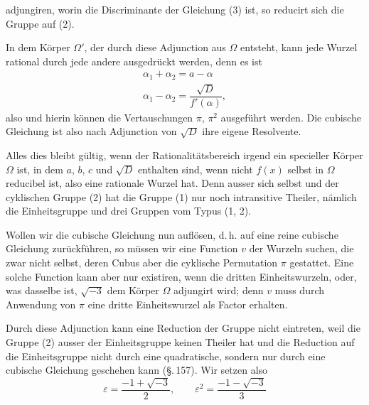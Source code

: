 
adjungiren, worin
die Discriminante der Gleichung (3) ist, so reducirt sich die Gruppe
auf (2).

In dem K\"orper $\Omega'$, der durch diese Adjunction aus $\Omega$
entsteht, kann jede Wurzel rational durch jede andere ausgedr\"uckt
werden, denn es ist
\[
\begin{gathered}
\alpha_1 + \alpha_2 = a - \alpha\\
\alpha_1 - \alpha_2 = \dfrac{\sqrt{D}}{f'(\alpha)},
\end{gathered}
\]
also
und hierin k\"onnen die Vertauschungen $\pi$, $\pi^2$ ausgef\"uhrt
werden. Die cubische Gleichung ist also nach Adjunction von $\sqrt{D}$
ihre eigene  Resolvente.

Alles dies bleibt g\"ultig, wenn der Rationalit\"atsbereich irgend
ein specieller K\"orper $\Omega$ ist, in dem $a$, $b$, $c$ und
$\sqrt{D}$ enthalten sind, wenn nicht $f(x)$ selbst in $\Omega$
reducibel ist, also eine rationale Wurzel hat. Denn ausser sich
selbst und der cyklischen Gruppe (2) hat die Gruppe (1) nur noch
intransitive Theiler, n\"amlich die Einheitsgruppe und drei Gruppen
vom Typus (1, 2).

Wollen wir die cubische Gleichung nun aufl\"osen, d.\,h. auf eine
reine cubische Gleichung zur\"uckf\"uhren, so m\"ussen wir eine
Function $v$ der Wurzeln suchen, die zwar nicht selbst, deren Cubus
aber die cyklische Permutation $\pi$ gestattet. Eine solche Function
kann aber nur existiren, wenn die dritten Einheitswurzeln, oder, was
dasselbe ist, $\sqrt{-3}$ dem K\"orper $\Omega$ adjungirt wird; denn
$v$ muss durch Anwendung von $\pi$ eine dritte Einheitswurzel als
Factor erhalten.

Durch diese Adjunction kann eine Reduction der Gruppe nicht
eintreten, weil die Gruppe (2) ausser der Einheitsgruppe keinen
Theiler hat und die Reduction auf die Einheitsgruppe nicht durch
eine quadratische, sondern nur durch eine cubische Gleichung
geschehen kann (\S.\,157). Wir setzen also
\[
\varepsilon = \dfrac{-1+\sqrt{-3}}{2}, \qquad
\varepsilon^2 = \dfrac{-1-\sqrt{-3}}{3}
\]
